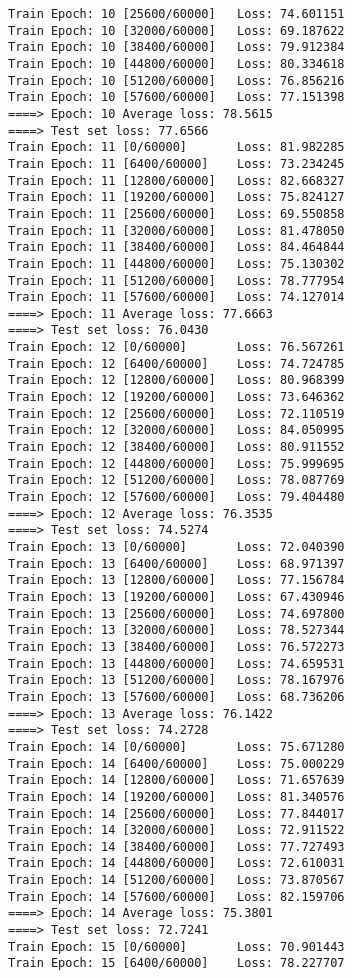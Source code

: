 \documentclass[11pt]{article}
\begin{document}
\begin{Verbatim}[commandchars=\\\{\}]
Train Epoch: 10 [25600/60000]   Loss: 74.601151
Train Epoch: 10 [32000/60000]   Loss: 69.187622
Train Epoch: 10 [38400/60000]   Loss: 79.912384
Train Epoch: 10 [44800/60000]   Loss: 80.334618
Train Epoch: 10 [51200/60000]   Loss: 76.856216
Train Epoch: 10 [57600/60000]   Loss: 77.151398
====> Epoch: 10 Average loss: 78.5615
====> Test set loss: 77.6566
Train Epoch: 11 [0/60000]       Loss: 81.982285
Train Epoch: 11 [6400/60000]    Loss: 73.234245
Train Epoch: 11 [12800/60000]   Loss: 82.668327
Train Epoch: 11 [19200/60000]   Loss: 75.824127
Train Epoch: 11 [25600/60000]   Loss: 69.550858
Train Epoch: 11 [32000/60000]   Loss: 81.478050
Train Epoch: 11 [38400/60000]   Loss: 84.464844
Train Epoch: 11 [44800/60000]   Loss: 75.130302
Train Epoch: 11 [51200/60000]   Loss: 78.777954
Train Epoch: 11 [57600/60000]   Loss: 74.127014
====> Epoch: 11 Average loss: 77.6663
====> Test set loss: 76.0430
Train Epoch: 12 [0/60000]       Loss: 76.567261
Train Epoch: 12 [6400/60000]    Loss: 74.724785
Train Epoch: 12 [12800/60000]   Loss: 80.968399
Train Epoch: 12 [19200/60000]   Loss: 73.646362
Train Epoch: 12 [25600/60000]   Loss: 72.110519
Train Epoch: 12 [32000/60000]   Loss: 84.050995
Train Epoch: 12 [38400/60000]   Loss: 80.911552
Train Epoch: 12 [44800/60000]   Loss: 75.999695
Train Epoch: 12 [51200/60000]   Loss: 78.087769
Train Epoch: 12 [57600/60000]   Loss: 79.404480
====> Epoch: 12 Average loss: 76.3535
====> Test set loss: 74.5274
Train Epoch: 13 [0/60000]       Loss: 72.040390
Train Epoch: 13 [6400/60000]    Loss: 68.971397
Train Epoch: 13 [12800/60000]   Loss: 77.156784
Train Epoch: 13 [19200/60000]   Loss: 67.430946
Train Epoch: 13 [25600/60000]   Loss: 74.697800
Train Epoch: 13 [32000/60000]   Loss: 78.527344
Train Epoch: 13 [38400/60000]   Loss: 76.572273
Train Epoch: 13 [44800/60000]   Loss: 74.659531
Train Epoch: 13 [51200/60000]   Loss: 78.167976
Train Epoch: 13 [57600/60000]   Loss: 68.736206
====> Epoch: 13 Average loss: 76.1422
====> Test set loss: 74.2728
Train Epoch: 14 [0/60000]       Loss: 75.671280
Train Epoch: 14 [6400/60000]    Loss: 75.000229
Train Epoch: 14 [12800/60000]   Loss: 71.657639
Train Epoch: 14 [19200/60000]   Loss: 81.340576
Train Epoch: 14 [25600/60000]   Loss: 77.844017
Train Epoch: 14 [32000/60000]   Loss: 72.911522
Train Epoch: 14 [38400/60000]   Loss: 77.727493
Train Epoch: 14 [44800/60000]   Loss: 72.610031
Train Epoch: 14 [51200/60000]   Loss: 73.870567
Train Epoch: 14 [57600/60000]   Loss: 82.159706
====> Epoch: 14 Average loss: 75.3801
====> Test set loss: 72.7241
Train Epoch: 15 [0/60000]       Loss: 70.901443
Train Epoch: 15 [6400/60000]    Loss: 78.227707

\end{Verbatim}
\end{document}
